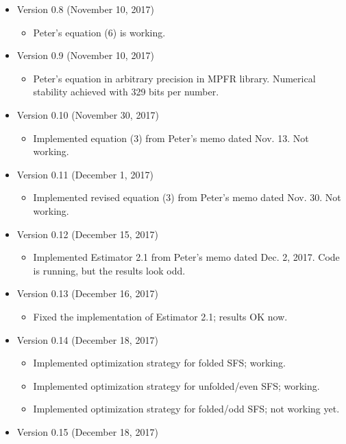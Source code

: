 \documentclass[a4paper, english]{article}
\begin{document}
\begin{itemize}
\item Version 0.8 (November 10, 2017)
  \begin{itemize}
    \item Peter's equation (6) is working.
  \end{itemize}
\item Version 0.9 (November 10, 2017)
  \begin{itemize}
  \item Peter's equation in arbitrary precision in MPFR
    library. Numerical stability achieved with 329 bits per number.
  \end{itemize}
\item Version 0.10 (November 30, 2017)
  \begin{itemize}
  \item Implemented equation (3) from Peter's memo dated Nov. 13. Not
    working.
  \end{itemize}
\item Version 0.11 (December 1, 2017)
  \begin{itemize}
  \item Implemented revised equation (3) from Peter's memo dated Nov. 30. Not
    working.
  \end{itemize}
\item Version 0.12 (December 15, 2017)
  \begin{itemize}
    \item Implemented Estimator 2.1 from Peter's memo dated Dec. 2,
      2017. Code is running, but the results look odd.
  \end{itemize}
\item Version 0.13 (December 16, 2017)
  \begin{itemize}
  \item Fixed the implementation of Estimator 2.1; results OK now.
  \end{itemize}
\item Version 0.14 (December 18, 2017)
  \begin{itemize}
  \item Implemented optimization strategy for folded SFS; working.
  \item Implemented optimization strategy for unfolded/even SFS;
    working.
  \item Implemented optimization strategy for folded/odd SFS; not
    working yet.
  \end{itemize}
\item Version 0.15 (December 18, 2017)
  \begin{itemize}

\end{itemize}
\end{itemize}
\end{document}
